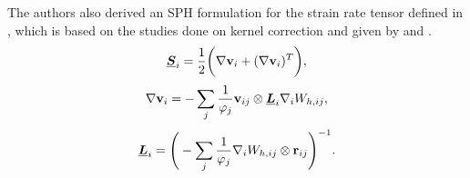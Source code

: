 The authors also derived an SPH formulation for the strain rate tensor defined in , which is based on the studies done on kernel correction \parencite{bonet1999variational, khayyer2008corrected} and given by  and . 
\begin{equation}
    \underline{\bm{S}}_i = \frac{1}{2} \bigg( \nabla \mathbf{v}_i + (\nabla \mathbf{v}_i)^T \bigg),
    \label{eq:Wang2020-strain-rate-tensor}
\end{equation}
\begin{equation}
    \nabla \mathbf{v}_i = - \sum_j \frac{1}{\varphi_j} \mathbf{v}_{ij} \otimes \underline{\bm{L}}_i \nabla_{i} W_{h, ij},
    \label{eq:Wang2020-vel-grad-term}
\end{equation}
\begin{equation}
    \underline{\bm{L}}_i = \Bigg(- \sum_j \frac{1}{\varphi_j} \nabla_{i} W_{h, ij} \otimes \mathbf{r}_{ij} \Bigg)^{-1}.
    \label{eq:Wang2020-corrective-matrix}
\end{equation}

